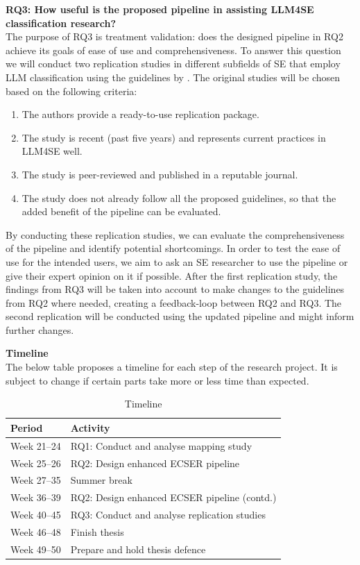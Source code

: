 \documentclass[a4paper]{article}
\newcommand{\emphasize}[1]{\textbf{#1}}
\begin{document}
\emphasize{RQ3: How useful is the proposed pipeline in assisting LLM4SE classification research?}\\
The purpose of RQ3 is treatment validation: does the designed pipeline in RQ2 achieve its goals of ease of use and comprehensiveness. To answer this question we will conduct two replication studies in different subfields of SE that employ LLM classification using the guidelines by \textcite{carver2010}. The original studies will be chosen based on the following criteria:
\begin{enumerate}
    \item The authors provide a ready-to-use replication package.
    \item The study is recent (past five years) and represents current practices in LLM4SE well.
    \item The study is peer-reviewed and published in a reputable journal.
    \item The study does not already follow all the proposed guidelines, so that the added benefit of the pipeline can be evaluated.
\end{enumerate}

By conducting these replication studies, we can evaluate the comprehensiveness of the pipeline and identify potential shortcomings. In order to test the ease of use for the intended users, we aim to ask an SE researcher to use the pipeline or give their expert opinion on it if possible. After the first replication study, the findings from RQ3 will be taken into account to make changes to the guidelines from RQ2 where needed, creating a feedback-loop between RQ2 and RQ3. The second replication will be conducted using the updated pipeline and might inform further changes.

\textbf{Timeline}\\
The below table proposes a timeline for each step of the research project. It is subject to change if certain parts take more or less time than expected.
\begin{table}[ht]
\caption{Timeline}
\begin{tabular}{|l|l|}
\hline
\textbf{Period} & \textbf{Activity} \\ \hline
Week 21–24 & RQ1: Conduct and analyse mapping study \\ \hline
Week 25–26 & RQ2: Design enhanced ECSER pipeline \\ \hline
Week 27–35 & Summer break \\ \hline
Week 36–39 & RQ2: Design enhanced ECSER pipeline (contd.) \\ \hline
Week 40–45 & RQ3: Conduct and analyse replication studies \\ \hline
Week 46–48 & Finish thesis \\ \hline
Week 49–50 & Prepare and hold thesis defence \\ \hline
\end{tabular}
\end{table}
\end{document}

